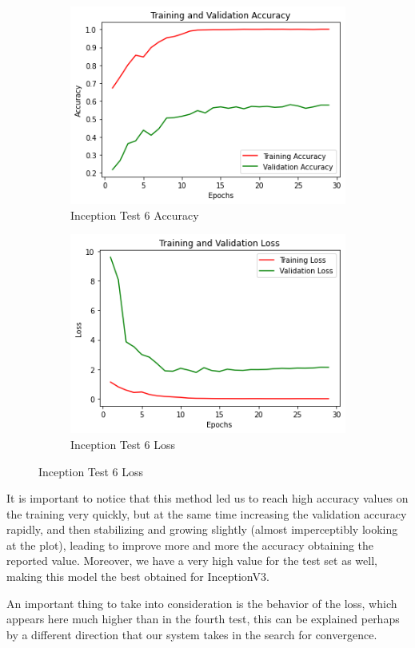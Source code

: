 \begin{figure}[H]
	\begin{subfigure}{0.5\textwidth}
		\includegraphics[width=0.9\linewidth]{img/inception/inceptionft3expacc.png} 
		\caption{Inception Test 6 Accuracy}
		\label{fig:inceptionft3expacc}
	\end{subfigure}
	\begin{subfigure}{0.5\textwidth}
		\includegraphics[width=0.9\linewidth]{img/inception/inceptionft3exploss.png}
		\caption{Inception Test 6 Loss}
		\label{fig:inceptionft3exploss}
	\end{subfigure}
\end{figure}

It is important to notice that this method led us to reach high accuracy values on the training very quickly, but at the same time increasing the validation accuracy rapidly, and then stabilizing and growing slightly (almost imperceptibly looking at the plot), leading to improve more and more the accuracy obtaining the reported value. Moreover, we have a very high value for the test set as well, making this model the best obtained for InceptionV3.

An important thing to take into consideration is the behavior of the loss, which appears here much higher than in the fourth test, this can be explained perhaps by a different direction that our system takes in the search for convergence.


